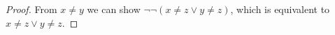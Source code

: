 \begin{proof}
  From $x\neq y$ %
  we can show $\neg \neg ( x \neq  z \vee y \neq  z)$, 
  which is equivalent to %
  $x\neq z \vee y \neq z$.%
\end{proof}
